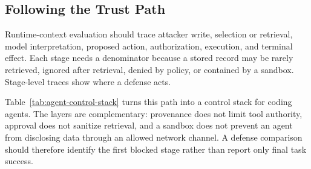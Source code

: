 \documentclass[acmsmall,screen,review]{acmart}
\begin{document}
\subsection{Following the Trust Path}
Runtime-context evaluation should trace attacker write, selection or retrieval, model interpretation, proposed action, authorization, execution, and terminal effect. Each stage needs a denominator because a stored record may be rarely retrieved, ignored after retrieval, denied by policy, or contained by a sandbox. Stage-level traces show where a defense acts.

Table~\ref{tab:agent-control-stack} turns this path into a control stack for coding agents. The layers are complementary: provenance does not limit tool authority, approval does not sanitize retrieval, and a sandbox does not prevent an agent from disclosing data through an allowed network channel. A defense comparison should therefore identify the first blocked stage rather than report only final task success.
\end{document}
